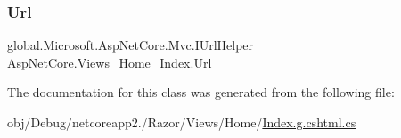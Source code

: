 \subsubsection{\texorpdfstring{Url}{Url}}
{\footnotesize\ttfamily global.\+Microsoft.\+Asp\+Net\+Core.\+Mvc.\+I\+Url\+Helper Asp\+Net\+Core.\+Views\+\_\+\+Home\+\_\+\+Index.\+Url\hspace{0.3cm}{\ttfamily [get]}}



The documentation for this class was generated from the following file\+:\begin{DoxyCompactItemize}
\item 
obj/\+Debug/netcoreapp2./\+Razor/\+Views/\+Home/\mbox{\hyperlink{_home_2_index_8g_8cshtml_8cs}{Index.\+g.\+cshtml.\+cs}}\end{DoxyCompactItemize}
